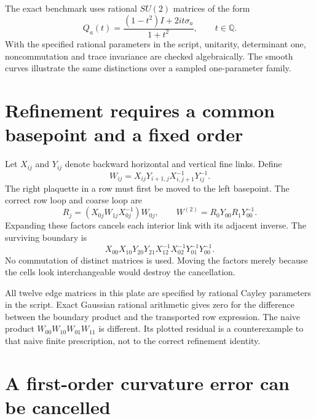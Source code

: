 The exact benchmark uses rational $SU(2)$ matrices of the form
\[
Q_a(t)=\frac{(1-t^2)I+2it\sigma_a}{1+t^2},
\qquad t\in\mathbb Q.
\]
With the specified rational parameters in the script, unitarity, determinant one, noncommutation and trace invariance are checked algebraically. The smooth curves illustrate the same distinctions over a sampled one-parameter family.



\clearpage
\section{Refinement requires a common basepoint and a fixed order}

Let $X_{ij}$ and $Y_{ij}$ denote backward horizontal and vertical fine links. Define
\[
W_{ij}=X_{ij}Y_{i+1,j}X_{i,j+1}^{-1}Y_{ij}^{-1}.
\]
The right plaquette in a row must first be moved to the left basepoint. The correct row loop and coarse loop are
\[
R_j=(X_{0j}W_{1j}X_{0j}^{-1})W_{0j},
\qquad W^{(2)}=R_0Y_{00}R_1Y_{00}^{-1}.
\]
Expanding these factors cancels each interior link with its adjacent inverse. The surviving boundary is
\[
X_{00}X_{10}Y_{20}Y_{21}
X_{12}^{-1}X_{02}^{-1}Y_{01}^{-1}Y_{00}^{-1}.
\]
No commutation of distinct matrices is used. Moving the factors merely because the cells look interchangeable would destroy the cancellation.

All twelve edge matrices in this plate are specified by rational Cayley parameters in the script. Exact Gaussian rational arithmetic gives zero for the difference between the boundary product and the transported row expression. The naive product $W_{00}W_{10}W_{01}W_{11}$ is different. Its plotted residual is a counterexample to that naive finite prescription, not to the correct refinement identity.



\clearpage
\section{A first-order curvature error can be cancelled}

